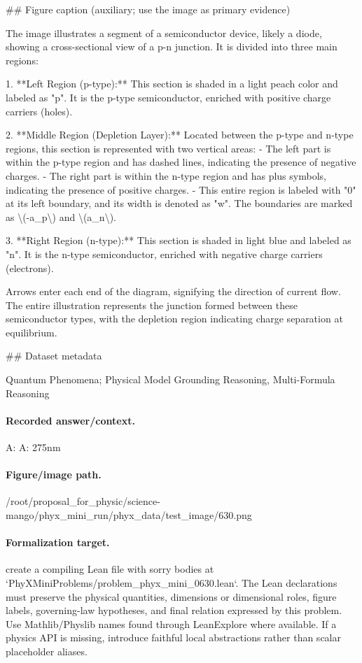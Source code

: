 \#\# Figure caption (auxiliary; use the image as primary evidence)

The image illustrates a segment of a semiconductor device, likely a diode, showing a cross-sectional view of a p-n junction. It is divided into three main regions:

1. **Left Region (p-type):** This section is shaded in a light peach color and labeled as "p". It is the p-type semiconductor, enriched with positive charge carriers (holes).

2. **Middle Region (Depletion Layer):** Located between the p-type and n-type regions, this section is represented with two vertical areas:
   - The left part is within the p-type region and has dashed lines, indicating the presence of negative charges.
   - The right part is within the n-type region and has plus symbols, indicating the presence of positive charges.
   - This entire region is labeled with "0" at its left boundary, and its width is denoted as "w". The boundaries are marked as \textbackslash{}(-a\_p\textbackslash{}) and \textbackslash{}(a\_n\textbackslash{}).

3. **Right Region (n-type):** This section is shaded in light blue and labeled as "n". It is the n-type semiconductor, enriched with negative charge carriers (electrons).

Arrows enter each end of the diagram, signifying the direction of current flow. The entire illustration represents the junction formed between these semiconductor types, with the depletion region indicating charge separation at equilibrium.

\#\# Dataset metadata

Quantum Phenomena; Physical Model Grounding Reasoning, Multi-Formula Reasoning

\paragraph{Recorded answer/context.}
A: A: 275nm

\paragraph{Figure/image path.}
/root/proposal\_for\_physic/science-mango/phyx\_mini\_run/phyx\_data/test\_image/630.png

\paragraph{Formalization target.}
create a compiling Lean file with sorry bodies at `PhyXMiniProblems/problem\_phyx\_mini\_0630.lean`. The Lean declarations must preserve the physical quantities, dimensions or dimensional roles, figure labels, governing-law hypotheses, and final relation expressed by this problem.
Use Mathlib/Physlib names found through LeanExplore where available. If a physics API is missing, introduce faithful local abstractions rather than scalar placeholder aliases.

